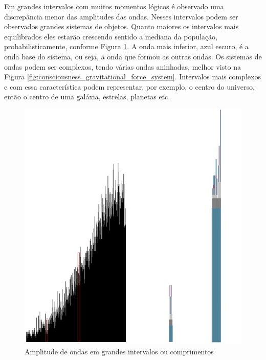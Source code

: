Em grandes intervalos com muitos momentos lógicos é observado uma discrepância menor das amplitudes das ondas. Nesses intervalos podem ser observados grandes sistemas de objetos. Quanto maiores os intervalos mais equilibrados eles estarão crescendo sentido a mediana da população, probabilisticamente, conforme Figura \ref{fig:consciousness_space_subconsciousness}. A onda mais inferior, azul escuro, é a onda base do sistema, ou seja, a onda que formou as outras ondas. Os sistemas de ondas podem ser complexos, tendo várias ondas aninhadas, melhor visto na Figura \ref{fig:consciousness_gravitational_force_system}. Intervalos mais complexos e com essa característica podem representar, por exemplo, o centro do universo, então o centro de uma galáxia, estrelas, planetas etc.
	\begin{figure}[H]
	\caption{Amplitude de ondas em grandes intervalos ou comprimentos}
	\label{fig:consciousness_space_subconsciousness}
	\centering
	\includegraphics[scale=.45]{sections/images/consciousness_space_subconsciousness.jpg}
	\end{figure}

